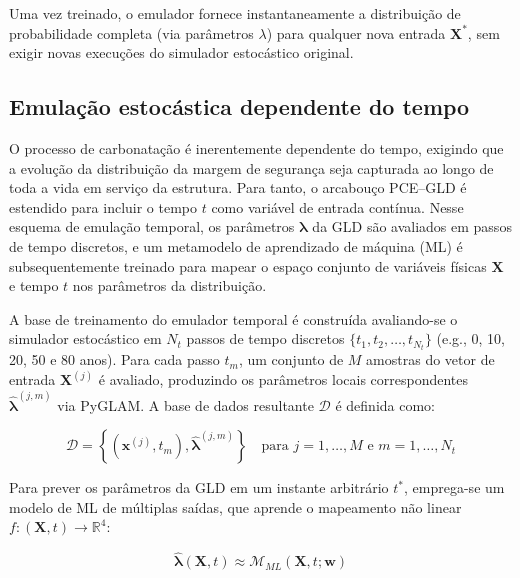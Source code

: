 Uma vez treinado, o emulador fornece instantaneamente a distribuição de probabilidade completa (via parâmetros $\lambda$) para qualquer nova entrada $\mathbf{X}^*$, sem exigir novas execuções do simulador estocástico original.

\subsection{Emulação estocástica dependente do tempo}
\label{subsec:temporal}

O processo de carbonatação é inerentemente dependente do tempo, exigindo que a evolução da distribuição da margem de segurança seja capturada ao longo de toda a vida em serviço da estrutura. Para tanto, o arcabouço PCE--GLD é estendido para incluir o tempo $t$ como variável de entrada contínua. Nesse esquema de emulação temporal, os parâmetros $\boldsymbol{\lambda}$ da GLD são avaliados em passos de tempo discretos, e um metamodelo de aprendizado de máquina (ML) é subsequentemente treinado para mapear o espaço conjunto de variáveis físicas $\mathbf{X}$ e tempo $t$ nos parâmetros da distribuição.

A base de treinamento do emulador temporal é construída avaliando-se o simulador estocástico em $N_t$ passos de tempo discretos $\{t_1, t_2, \dots, t_{N_t}\}$ (e.g., 0, 10, 20, 50 e 80 anos). Para cada passo $t_m$, um conjunto de $M$ amostras do vetor de entrada $\mathbf{X}^{(j)}$ é avaliado, produzindo os parâmetros locais correspondentes $\hat{\boldsymbol{\lambda}}^{(j, m)}$ via PyGLAM. A base de dados resultante $\mathcal{D}$ é definida como:

\begin{equation}
\mathcal{D} = \left\{ \left( \mathbf{x}^{(j)}, t_m \right), \hat{\boldsymbol{\lambda}}^{(j, m)} \right\} \quad \text{para } j=1,\dots,M \text{ e } m=1,\dots,N_t
\label{eq:dataset_temporal}
\end{equation}

Para prever os parâmetros da GLD em um instante arbitrário $t^*$, emprega-se um modelo de ML de múltiplas saídas, que aprende o mapeamento não linear $f: (\mathbf{X}, t) \to \mathbb{R}^4$:

\begin{equation}
\hat{\boldsymbol{\lambda}}(\mathbf{X}, t) \approx \mathcal{M}_{ML}(\mathbf{X}, t; \mathbf{w})
\label{eq:ml_temporal}
\end{equation}

